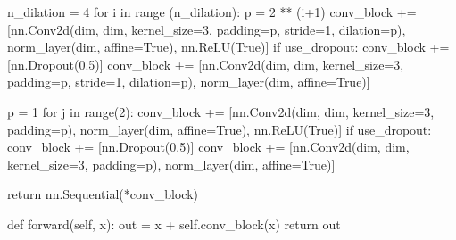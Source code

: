 \documentclass[a4paper]{article}
\begin{document}
\begin{python}
        n_dilation = 4
        for i in range (n_dilation):
            p = 2 ** (i+1)
            conv_block += [nn.Conv2d(dim, dim, kernel_size=3, padding=p, stride=1, dilation=p),
                           norm_layer(dim, affine=True),
                           nn.ReLU(True)]
            if use_dropout:
                conv_block += [nn.Dropout(0.5)]
            conv_block += [nn.Conv2d(dim, dim, kernel_size=3, padding=p, stride=1, dilation=p),
                           norm_layer(dim, affine=True)]

        p = 1
        for j in range(2):
            conv_block += [nn.Conv2d(dim, dim, kernel_size=3, padding=p),
                           norm_layer(dim, affine=True),
                           nn.ReLU(True)]
            if use_dropout:
                conv_block += [nn.Dropout(0.5)]
            conv_block += [nn.Conv2d(dim, dim, kernel_size=3, padding=p),
                           norm_layer(dim, affine=True)]

        return nn.Sequential(*conv_block)

    def forward(self, x):
        out = x + self.conv_block(x)
        return out
\end{python}
















{\small


}
\end{document}
